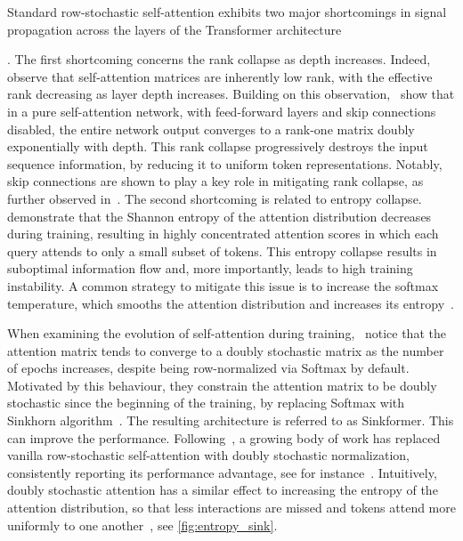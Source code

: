 \documentclass{article}
\theoremstyle{definition}
\theoremstyle{plain}
\begin{document}
Standard row-stochastic self-attention exhibits two major {shortcomings} in signal propagation across the {layers} of the Transformer {architecture} {\cite{giorlandino2026}. {The first shortcoming concerns the rank collapse as depth increases. Indeed,}~\cite{wang2020linformer} observe that self-attention matrices are inherently low rank, with the effective rank decreasing {as layer depth increases}. Building on this observation,~\cite{dong2021attention} show that in a pure self-attention network, with feed-forward layers and skip connections disabled, the entire network output converges to a rank-one matrix doubly exponentially with depth. This rank collapse progressively destroys the input sequence information, by reducing it to uniform token representations. Notably, skip connections are shown to play a key role in mitigating rank collapse, as further observed in~\cite{Noci2022SignalPI,Wang2022DeepNetST}. {The second shortcoming is related to} entropy collapse.
\cite{entropy_collapse} demonstrate that the Shannon entropy of the attention distribution decreases during training, resulting in highly concentrated attention scores in which each query attends to only a small subset of tokens. This entropy collapse results in suboptimal information flow and, more importantly, leads to high training instability. A common strategy to mitigate this issue is to increase the softmax temperature, which smooths the attention distribution and increases its entropy~\cite{Agarwala2020TemperatureCT,xuan2025}.

When examining the evolution of self-attention during training,~\cite{sinkformer} notice that the attention matrix tends to converge to a doubly stochastic matrix as the number of epochs increases, despite being row-normalized via Softmax by default. Motivated by this behaviour, they constrain the attention matrix to be doubly stochastic since the beginning of the training, by replacing Softmax with Sinkhorn algorithm~\cite{Sinkhorn1964,Sinkhorn1967ConcerningNM}. The resulting architecture is referred to as Sinkformer. This can improve the performance. Following~\cite{sinkformer}, a growing body of work has replaced vanilla row-stochastic self-attention with doubly stochastic normalization, consistently reporting its performance advantage, see for instance~\cite{multipromptsinkhornattention, espformer, lotformer, quantumds}. Intuitively, doubly stochastic attention has a similar effect to increasing the entropy of the attention distribution, so that less interactions are missed and tokens attend more uniformly to one another~\cite{quantumds}, see \cref{fig:entropy_sink}.

}
\end{document}
